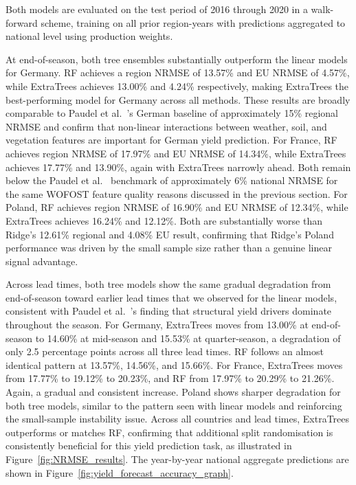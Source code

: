 \documentclass[pdflatex,sn-mathphys-num, oneside]{sn-jnl}%
\theoremstyle{thmstyleone}%
\theoremstyle{thmstyletwo}%
\theoremstyle{thmstylethree}%
\begin{document}
Both models are evaluated on the test period of 2016 through 2020 in a walk-forward scheme, training on all prior region-years with predictions aggregated to national level using production weights.

At end-of-season, both tree ensembles substantially outperform the linear models for Germany. RF achieves a region NRMSE of 13.57\% and EU NRMSE of 4.57\%, while ExtraTrees achieves 13.00\% and 4.24\% respectively, making ExtraTrees the best-performing model for Germany across all methods. These results are broadly comparable to Paudel et al.~\cite{bib16}'s German baseline of approximately 15\% regional NRMSE and confirm that non-linear interactions between weather, soil, and vegetation features are important for German yield prediction. For France, RF achieves region NRMSE of 17.97\% and EU NRMSE of 14.34\%, while ExtraTrees achieves 17.77\% and 13.90\%, again with ExtraTrees narrowly ahead. Both remain below the Paudel et al.~\cite{bib16} benchmark of approximately 6\% national NRMSE for the same WOFOST feature quality reasons discussed in the previous section. For Poland, RF achieves region NRMSE of 16.90\% and EU NRMSE of 12.34\%, while ExtraTrees achieves 16.24\% and 12.12\%. Both are substantially worse than Ridge's 12.61\% regional and 4.08\% EU result, confirming that Ridge's Poland performance was driven by the small sample size rather than a genuine linear signal advantage.

Across lead times, both tree models show the same gradual degradation from end-of-season toward earlier lead times that we observed for the linear models, consistent with Paudel et al.~\cite{bib16}'s finding that structural yield drivers dominate throughout the season. For Germany, ExtraTrees moves from 13.00\% at end-of-season to 14.60\% at mid-season and 15.53\% at quarter-season, a degradation of only 2.5 percentage points across all three lead times. RF follows an almost identical pattern at 13.57\%, 14.56\%, and 15.66\%. For France, ExtraTrees moves from 17.77\% to 19.12\% to 20.23\%, and RF from 17.97\% to 20.29\% to 21.26\%. Again, a gradual and consistent increase. Poland shows sharper degradation for both tree models, similar to the pattern seen with linear models and reinforcing the small-sample instability issue. Across all countries and lead times, ExtraTrees outperforms or matches RF, confirming that additional split randomisation is consistently beneficial for this yield prediction task, as illustrated in Figure~\ref{fig:NRMSE_results}. The year-by-year national aggregate predictions are shown in Figure~\ref{fig:yield_forecast_accuracy_graph}.
\end{document}
